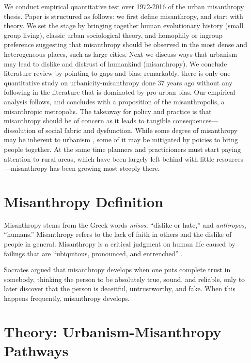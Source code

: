 \documentclass[11pt, letterpaper]{article}
\begin{document}
\begin{spacing}{1.4}
We conduct empirical quantitative test over 1972-2016 of the
 urban misanthropy thesis. Paper is structured as follows: 
 we first define misanthropy, and start with theory. We set the stage by bringing
together human evolutionary history (small group living),  classic urban
sociological theory, and homophily or ingroup preference suggesting that
misanthropy should be observed in the most dense and heterogeneous places, such as large cities.
Next we discuss ways that urbanism may lead to dislike and distrust of humankind
(misanthropy). We conclude literature review by pointing to gaps and bias:
remarkably, there is only one quantitative study on urbanicity-misanthropy done 37 years ago
without any following in the literature that is dominated by pro-urban bias. Our
empirical analysis follows, and concludes with a proposition of the misanthropolis,
a misanthropic metropolis. 
The takeaway for policy and practice is that misanthropy should be of concern as
it leads to tangible consequences---dissolution of social fabric and
dysfunction. While some degree of misanthropy may be inherent to urbanism \citep{thrift05}, some
of it may be mitigated by poicies to bring people together. At the same time
planners and practicioners must start paying attention to rural areas, which
have been largely left behind with little resources---misanthropy has been
growing most steeply there. 

   
\section*{Misanthropy Definition}


Misanthropy stems from the Greek words \textit{misos}, ``dislike or hate,'' and
\textit{anthropos}, ``humans.''  Misanthropy refers to the lack of faith in others and the dislike of people in general.
%
Misanthropy is a critical judgment on human life caused by failings that are
``ubiquitous, pronounced, and entrenched''
\citep[p. 7]{cooper2018animals}.

Socrates \citep[cited in][]{melgar13} argued
that misanthropy develops when one puts complete trust in somebody, thinking the
person to be absolutely true, sound, and reliable, only to later discover that
the person is deceitful, untrustworthy, and fake. When this happens frequently,
misanthropy develops.

\section*{Theory: Urbanism-Misanthropy Pathways}


\end{spacing}
\end{document}
